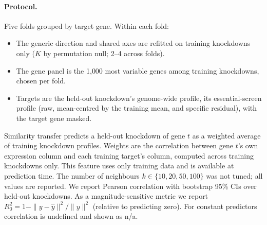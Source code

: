 \documentclass[10pt]{article}
\begin{document}
\paragraph{Protocol.} Five folds grouped by target gene. Within each fold:
\begin{itemize}
\item The generic direction and shared axes are refitted on training knockdowns only ($K$ by permutation null; 2--4 across folds).
\item The gene panel is the 1{,}000 most variable genes among training knockdowns, chosen per fold.
\item Targets are the held-out knockdown's genome-wide profile, its essential-screen profile (raw, mean-centred by the training mean, and specific residual), with the target gene masked.
\end{itemize}
Similarity transfer predicts a held-out knockdown of gene $t$ as a weighted average of training knockdown profiles. Weights are the correlation between gene $t$'s own expression column and each training target's column, computed across training knockdowns only. This feature uses only training data and is available at prediction time.
The number of neighbours $k\in\{10,20,50,100\}$ was not tuned; all values are reported.
We report Pearson correlation with bootstrap 95\% CIs over held-out knockdowns. As a magnitude-sensitive metric we report $R^2_0=1-\|y-\hat y\|^2/\|y\|^2$ (relative to predicting zero). For constant predictors correlation is undefined and shown as n/a.
\end{document}
